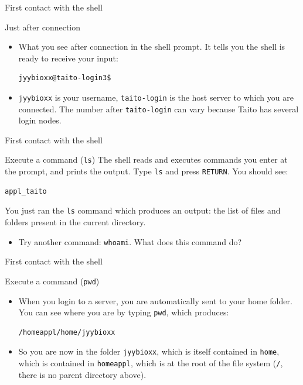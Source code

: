 \documentclass[big]{beamer}
\begin{document}
\begin{frame}[fragile,label=sec-2-8]{First contact with the shell}
 \begin{block}{Just after connection}
\begin{itemize}
\item What you see after connection in the \alert{shell prompt}. It tells you the shell
is ready to receive your input:
\begin{verbatim}
jyybioxx@taito-login3$
\end{verbatim}
\item \texttt{jyybioxx} is your username, \texttt{taito-login} is the host server to which you
are connected. The number after \texttt{taito-login} can vary because Taito has
several login nodes.
\end{itemize}
\end{block}
\end{frame}
\begin{frame}[fragile,label=sec-2-9]{First contact with the shell}
 \begin{block}{Execute a command (\texttt{ls})}
The shell \alert{reads} and \alert{executes} commands you enter at the prompt, and \alert{prints}
the output. Type \texttt{ls} and press \texttt{RETURN}. You should see:
\begin{verbatim}
appl_taito
\end{verbatim}
\end{block}
\begin{block}{}
You just ran the \texttt{ls} command which produces an output: the list of files and
folders present in the current directory. 

\begin{itemize}
\item Try another command: \texttt{whoami}. What does this command do?
\end{itemize}
\end{block}
\end{frame}
\begin{frame}[fragile,label=sec-2-10]{First contact with the shell}
 \begin{block}{Execute a command (\texttt{pwd})}
\begin{itemize}
\item When you login to a server, you are automatically sent to your home
folder. You can see where you are by typing \texttt{pwd}, which produces:
\begin{verbatim}
/homeappl/home/jyybioxx
\end{verbatim}
\item So you are now in the folder \texttt{jyybioxx}, which is itself contained in \texttt{home},
which is contained in \texttt{homeappl}, which is at the root of the file system
(\texttt{/}, there is no parent directory above).
\end{itemize}
\end{block}
\end{frame}
\end{document}
